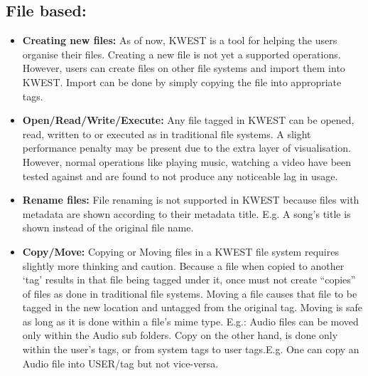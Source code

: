 \subsection{File based:}
\begin{itemize}
\item \textbf{Creating new files:}
As of now, KWEST is a tool for helping the users organise their files. Creating a new file is not yet a supported operations. However, users can create files on other file systems and import them into KWEST. Import can be done by simply copying the file into appropriate tags.
\item \textbf{Open/Read/Write/Execute:}
Any file tagged in KWEST can be opened, read, written to or executed as in traditional file systems. A slight performance penalty may be present due to the extra layer of visualisation. However, normal operations like playing music, watching a video have been tested against and are found to not produce any noticeable lag in usage.
\item \textbf{Rename files:}
File renaming is not supported in KWEST because files with metadata are shown according to their metadata title. \newline
E.g. A song's title is shown instead of the original file name. 
\item \textbf{Copy/Move:}
Copying or Moving files in a KWEST file system requires slightly more thinking and caution. Because a file when copied to another `tag' results in that file being tagged under it, once must not create ``copies'' of files as done in traditional file systems. Moving a file causes that file to be tagged in the new location and untagged from the original tag. Moving is safe as long as it is done within a file's mime type. \newline
E.g.: Audio files can be moved only within the Audio sub folders. Copy on the other hand, is done only within the user's tags, or from system tags to user tags.E.g. One can copy an Audio file into USER/tag but not vice-versa.
\begin{figure}[htb]
\centering
\setlength\fboxsep{0pt}
\setlength\fboxrule{0.5pt}

\end{figure}
\end{itemize}
